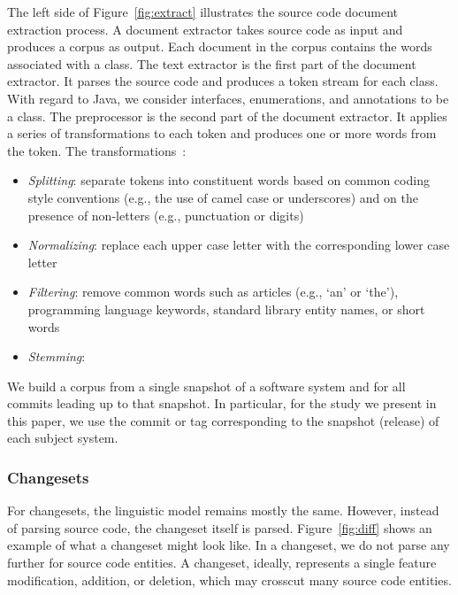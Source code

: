 The left side of Figure~\ref{fig:extract} illustrates the source code
document extraction process.
A document extractor takes source code as input and produces a corpus as
output.
Each document in the corpus contains the words associated with a class.
The text extractor is the first part of the document extractor.
It parses the source code and produces a token stream for each class.
With regard to Java, we consider interfaces, enumerations, and
annotations to be a class.
The preprocessor is the second part of the document extractor.
It applies a series of transformations to each token and
produces one or more words from the token.
The transformations~\cite{Marcus-etal:04,Marcus-Menzies:10}: %
\begin{itemize}
    \item {\it Splitting}: separate tokens into constituent words
        based on common coding style conventions (e.g., the use of camel case or underscores)
        and on the presence of non-letters (e.g., punctuation or digits)
    \item {\it Normalizing}: replace each upper case letter with the corresponding
        lower case letter
    \item {\it Filtering}: remove common words such as articles (e.g., `an' or `the'),
        programming language keywords, standard library entity names, or short words
    \item {\it Stemming}:  
\end{itemize}
We build a corpus from a single snapshot of a software system and for all
commits leading up to that snapshot.
In particular, for the study we present in this paper,
we use the commit or tag corresponding to the snapshot (release) of each subject system.

\subsubsection{Changesets}

For changesets, the linguistic model remains mostly the same. However,
instead of parsing source code, the changeset itself is parsed.
Figure~\ref{fig:diff} shows an example of what a changeset might look
like.
In a changeset, we do not parse any further for source code entities.
A changeset, ideally, represents a single feature modification, addition, or deletion, which may crosscut many source code entities.


